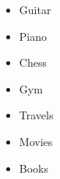 \begin{multicols}{2}
        \begin{itemize} 
            \item  Guitar 
            \item  Piano 
            \item  Chess 
            \item  Gym 
            \item  Travels 
            \item  Movies 
            \item  Books 
    \end{itemize}
    \end{multicols}